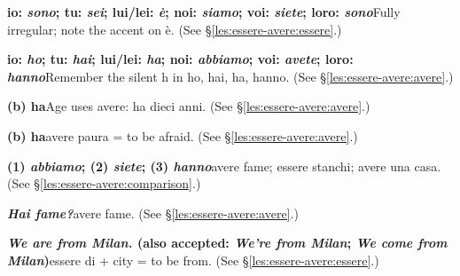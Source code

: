 \documentclass[11pt,a4paper,twoside,openright]{book}
\newcommand{\answerheading}[1]{\par\medskip\noindent{\sffamily\bfseries\small #1}\par\nopagebreak}
\begin{document}
\answerheading{\S\ref{les:essere-avere} essere and avere}\label{ans:essere-avere}
\begin{answers}
\item\relax \textbf{io: \textit{sono}; tu: \textit{sei}; lui/lei: \textit{è}; noi: \textit{siamo}; voi: \textit{siete}; loro: \textit{sono}}\newline Fully irregular; note the accent on è. {\color{muted}(See \S\ref{les:essere-avere:essere}.)}
\item\relax \textbf{io: \textit{ho}; tu: \textit{hai}; lui/lei: \textit{ha}; noi: \textit{abbiamo}; voi: \textit{avete}; loro: \textit{hanno}}\newline Remember the silent h in ho, hai, ha, hanno. {\color{muted}(See \S\ref{les:essere-avere:avere}.)}
\item\relax \textbf{(b) ha}\newline Age uses avere: ha dieci anni. {\color{muted}(See \S\ref{les:essere-avere:avere}.)}
\item\relax \textbf{(b) ha}\newline avere paura = to be afraid. {\color{muted}(See \S\ref{les:essere-avere:avere}.)}
\item\relax \textbf{(1) \textit{abbiamo}; (2) \textit{siete}; (3) \textit{hanno}}\newline avere fame; essere stanchi; avere una casa. {\color{muted}(See \S\ref{les:essere-avere:comparison}.)}
\item\relax \textbf{\textit{Hai fame?}}\newline avere fame. {\color{muted}(See \S\ref{les:essere-avere:avere}.)}
\item\relax \textbf{\textit{We are from Milan.} {\color{muted}(also accepted: \textit{We're from Milan}; \textit{We come from Milan})}}\newline essere di + city = to be from. {\color{muted}(See \S\ref{les:essere-avere:essere}.)}
\end{answers}
\end{document}
